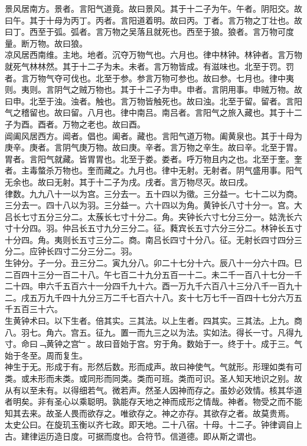 \documentclass{zhvt-classic}
\begin{document}
\hspace*{2em}景风居南方。景者。言阳气道竟。故曰景风。其于十二子为午。午者。阴阳交。故曰午。其于十母为丙丁。丙者。言阳道着明。故曰丙。丁者。言万物之丁壮也。故曰丁。西至于弧。弧者。言万物之吴落且就死也。西至于狼。狼者。言万物可度量。断万物。故曰狼。\\
\hspace*{2em}凉风居西南维。主地。地者。沉夺万物气也。六月也。律中林钟。林钟者。言万物就死气林林然。其于十二子为未。未者。言万物皆成。有滋味也。北至于罚。罚者。言万物气夺可伐也。北至于参。参言万物可参也。故曰参。七月也。律中夷则。夷则。言阴气之贼万物也。其于十二子为申。申者。言阴用事。申贼万物。故曰申。北至于浊。浊者。触也。言万物皆触死也。故曰浊。北至于留。留者。言阳气之稽留也。故曰留。八月也。律中南吕。南吕者。言阳气之旅入藏也。其于十二子为酉。酉者。万物之老也。故曰酉。\\
\hspace*{2em}阊阖风居西方。阊者。倡也。阖者。藏也。言阳气道万物。阖黄泉也。其于十母为庚辛。庚者。言阴气庚万物。故曰庚。辛者。言万物之辛生。故曰辛。北至于胃。胃者。言阳气就藏。皆胃胃也。北至于娄。娄者。呼万物且内之也。北至于奎。奎者。主毒螫杀万物也。奎而藏之。九月也。律中无射。无射者。阴气盛用事。阳气无余也。故曰无射。其于十二子为戌。戌者。言万物尽灭。故曰戌。\\
\hspace*{2em}律数。九九八十一以为宫。三分去一。五十四以为徵。三分益一。七十二以为商。三分去一。四十八以为羽。三分益一。六十四以为角。黄钟长八寸十分一。宫。大吕长七寸五分三分二。太蔟长七寸十分二。角。夹钟长六寸七分三分一。姑洗长六寸十分四。羽。仲吕长五寸九分三分二。征。蕤宾长五寸六分三分二。林钟长五寸十分四。角。夷则长五寸三分二。商。南吕长四寸十分八。征。无射长四寸四分三分二。应钟长四寸二分三分二。羽。\\
\hspace*{2em}生钟分。子一分。丑三分二。寅九分八。卯二十七分十六。辰八十一分六十四。巳二百四十三分一百二十八。午七百二十九分五百一十二。未二千一百八十七分一千二十四。申六千五百六十一分四千九十六。酉一万九千六百八十三分八千一百九十二。戌五万九千四十九分三万二千七百六十八。亥十七万七千一百四十七分六万五千五百三十六。\\
\hspace*{2em}生黄钟术曰。以下生者。倍其实。三其法。以上生者。四其实。三其法。上九。商八。羽七。角六。宫五。征九。置一而九三之以为法。实如法。得长一寸。凡得九寸。命曰﹁黄钟之宫﹂。故曰音始于宫。穷于角。数始于一。终于十。成于三。气始于冬至。周而复生。\\
\hspace*{2em}神生于无。形成于有。形然后数。形而成声。故曰神使气。气就形。形理如类有可类。或未形而未类。或同形而同类。类而可班。类而可识。圣人知天地识之别。故从有以至未有。以得细若气。微若声。然圣人因神而存之。虽妙必效情。核其华道者明矣。非有圣心以乘聪明。孰能存天地之神而成形之情哉。神者。物受之而不能知其去来。故圣人畏而欲存之。唯欲存之。神之亦存。其欲存之者。故莫贵焉。\\
\hspace*{2em}太史公曰。在旋玑玉衡以齐七政。即天地。二十八宿。十母。十二子。钟律调自上古。建律运历造日度。可据而度也。合符节。信道德。即从斯之谓也。\\
\end{document}
